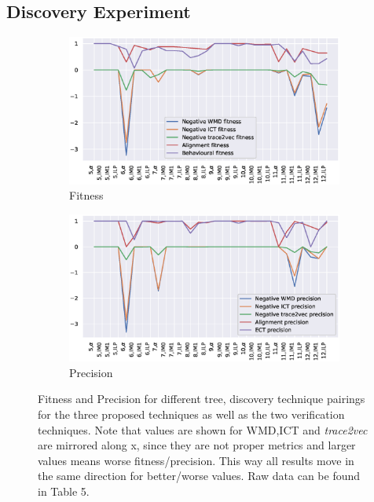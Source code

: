 \documentclass[runningheads]{template/llncs}
\begin{document}
\subsection{Discovery Experiment}
\begin{figure}
	\centering
	\begin{subfigure}[b]{0.49\textwidth}
		\centering
		\includegraphics[width=\textwidth]{figures/fitness}
		\caption{Fitness}
		\label{fig:fitness}
	\end{subfigure}
	\hfill
	\begin{subfigure}[b]{0.49\textwidth}
		\centering
		\includegraphics[width=\textwidth]{figures/precision}
		\caption{Precision}
		\label{fig:precision}
	\end{subfigure}
	\caption{Fitness and Precision for different tree, discovery technique pairings for the three proposed techniques as well as the two verification techniques. 
		Note that values are shown for WMD,ICT and \emph{trace2vec} are mirrored along x, since they are not proper metrics and larger values means worse fitness/precision. 
		This way all results move in the same direction for better/worse values.
		Raw data can be found in \cite{PBWe20} Table 5.}
	\label{fig:discovery}
\end{figure}
\end{document}
